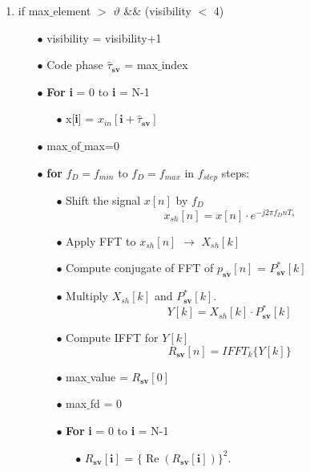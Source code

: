 \documentclass[journal,10pt,onecolumn]{article}
\begin{document}
\begin{enumerate}
\begin{enumerate}
        \item if max$\_$element $>$ $\vartheta$   $\&\&$ (visibility $<$ 4)
        \begin{enumerate}
            \item[$\bullet$] visibility = visibility+1
            \item[$\bullet$] Code phase $\hat{\tau}_{\textbf{sv}}$ = max$\_$index
            \item[$\bullet$] \textbf{For} \textbf{i} = 0 to \textbf{i} = N-1
            \begin{enumerate}
                \item[$\bullet$]  x[\textbf{i}] = $x_{in}[\textbf{i}+\hat{\tau}_{\textbf{sv}}]$
            \end{enumerate}
        \item[$\bullet$] max$\_$of$\_$max=0
        \item[$\bullet$] \textbf{for} $f_D = f_{min}$ to $f_D = f_{max}$ in $f_{step}$ steps:
        \begin{enumerate}
            \item[$\bullet$] Shift the signal $x[n]$ by $f_D$
            \begin{equation}
                x_{sh}[n] = x[n]\cdot e ^{-j 2 \pi f_D n T_s} 
            \end{equation}
            \item[$\bullet$] Apply FFT to $x_{sh}[n]$ $\longrightarrow$ $X_{sh}[k]$
            \item[$\bullet$] Compute conjugate of FFT of $p_{\textbf{sv}}[n]$ = $P_{\textbf{sv}}^*[k ]$
        \item[$\bullet$] Multiply $X_{sh}[k]$ and $P_{\textbf{sv}}^*[k ]$.
            \begin{equation}
                Y[k] = X_{sh}[k] \cdot P_{\textbf{sv}}^*[k]                
            \end{equation}
        \item[$\bullet$] Compute IFFT for $Y[k]$
            \begin{equation}
                R_{\textbf{sv}}[n] =  IFFT_k \{Y[k] \} 
            \end{equation}
            \item[$\bullet$] max$\_$value = $R{_{\textbf{sv}}}[0]$
        \item[$\bullet$] max$\_$fd    = 0
        \item[$\bullet$] \textbf{For} \textbf{i} = 0 to \textbf{i} = N-1
        \begin{itemize}
            \item[$\bullet$] $R{_{\textbf{sv}}}[\textbf{i}]$ = $\{\operatorname{Re}(R{_{\textbf{sv}}}[\textbf{i}])\}^2$.
        \end{itemize}
        

\end{enumerate}
\end{enumerate}
\end{enumerate}
\end{enumerate}
\end{document}
